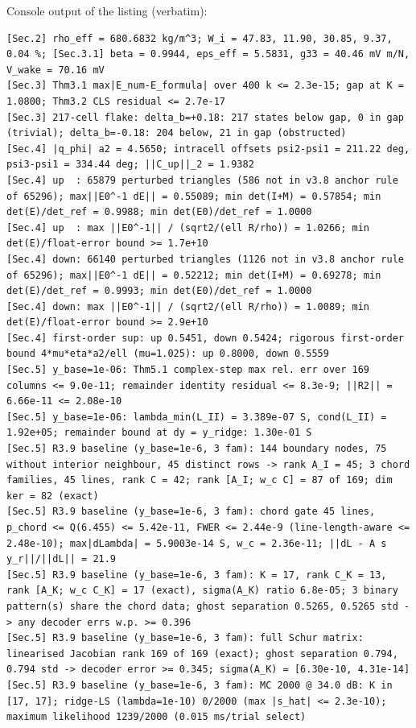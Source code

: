 \documentclass[11pt,a4paper]{article}
\theoremstyle{definition}
\theoremstyle{remark}
\begin{document}
\noindent Console output of the listing (verbatim):
\begin{lstlisting}[style=consolestyle]
[Sec.2] rho_eff = 680.6832 kg/m^3; W_i = 47.83, 11.90, 30.85, 9.37, 0.04 %; [Sec.3.1] beta = 0.9944, eps_eff = 5.5831, g33 = 40.46 mV m/N, V_wake = 70.16 mV
[Sec.3] Thm3.1 max|E_num-E_formula| over 400 k <= 2.3e-15; gap at K = 1.0800; Thm3.2 CLS residual <= 2.7e-17
[Sec.3] 217-cell flake: delta_b=+0.18: 217 states below gap, 0 in gap (trivial); delta_b=-0.18: 204 below, 21 in gap (obstructed)
[Sec.4] |q_phi| a2 = 4.5650; intracell offsets psi2-psi1 = 211.22 deg, psi3-psi1 = 334.44 deg; ||C_up||_2 = 1.9382
[Sec.4] up  : 65879 perturbed triangles (586 not in v3.8 anchor rule of 65296); max||E0^-1 dE|| = 0.55089; min det(I+M) = 0.57854; min det(E)/det_ref = 0.9988; min det(E0)/det_ref = 1.0000
[Sec.4] up  : max ||E0^-1|| / (sqrt2/(ell R/rho)) = 1.0266; min det(E)/float-error bound >= 1.7e+10
[Sec.4] down: 66140 perturbed triangles (1126 not in v3.8 anchor rule of 65296); max||E0^-1 dE|| = 0.52212; min det(I+M) = 0.69278; min det(E)/det_ref = 0.9993; min det(E0)/det_ref = 1.0000
[Sec.4] down: max ||E0^-1|| / (sqrt2/(ell R/rho)) = 1.0089; min det(E)/float-error bound >= 2.9e+10
[Sec.4] first-order sup: up 0.5451, down 0.5424; rigorous first-order bound 4*mu*eta*a2/ell (mu=1.025): up 0.8000, down 0.5559
[Sec.5] y_base=1e-06: Thm5.1 complex-step max rel. err over 169 columns <= 9.0e-11; remainder identity residual <= 8.3e-9; ||R2|| = 6.66e-11 <= 2.08e-10
[Sec.5] y_base=1e-06: lambda_min(L_II) = 3.389e-07 S, cond(L_II) = 1.92e+05; remainder bound at dy = y_ridge: 1.30e-01 S
[Sec.5] R3.9 baseline (y_base=1e-6, 3 fam): 144 boundary nodes, 75 without interior neighbour, 45 distinct rows -> rank A_I = 45; 3 chord families, 45 lines, rank C = 42; rank [A_I; w_c C] = 87 of 169; dim ker = 82 (exact)
[Sec.5] R3.9 baseline (y_base=1e-6, 3 fam): chord gate 45 lines, p_chord <= Q(6.455) <= 5.42e-11, FWER <= 2.44e-9 (line-length-aware <= 2.48e-10); max|dLambda| = 5.9003e-14 S, w_c = 2.36e-11; ||dL - A s y_r||/||dL|| = 21.9
[Sec.5] R3.9 baseline (y_base=1e-6, 3 fam): K = 17, rank C_K = 13, rank [A_K; w_c C_K] = 17 (exact), sigma(A_K) ratio 6.8e-05; 3 binary pattern(s) share the chord data; ghost separation 0.5265, 0.5265 std -> any decoder errs w.p. >= 0.396
[Sec.5] R3.9 baseline (y_base=1e-6, 3 fam): full Schur matrix: linearised Jacobian rank 169 of 169 (exact); ghost separation 0.794, 0.794 std -> decoder error >= 0.345; sigma(A_K) = [6.30e-10, 4.31e-14]
[Sec.5] R3.9 baseline (y_base=1e-6, 3 fam): MC 2000 @ 34.0 dB: K in [17, 17]; ridge-LS (lambda=1e-10) 0/2000 (max |s_hat| <= 2.3e-10); maximum likelihood 1239/2000 (0.015 ms/trial select)

\end{lstlisting}
\end{document}
